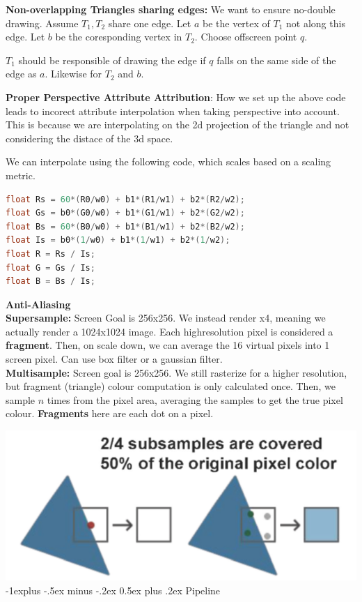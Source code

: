 \documentclass[letterpaper, 8pt]{extarticle}
\makeatletter
\renewcommand{\section}{\@startsection{section}{1}{0mm}%
                                {-1explus -.5ex minus -.2ex}%
                                {0.5ex plus .2ex}%
                                {\normalfont\small\bfseries}}
\makeatother
\begin{document}
\begin{multicols*}{4}

\textbf{Non-overlapping Triangles sharing edges:} We want to ensure no-double drawing.
Assume $T_1, T_2$ share one edge. Let $a$ be the vertex of $T_1$ not along this edge. Let $b$ be the coresponding vertex in $T_2$.
Choose offscreen point $q$.

$T_1$ should be responsible of drawing the edge if $q$ falls on the same side of the edge as $a$. Likewise for $T_2$ and $b$.


\textbf{Proper Perspective Attribute Attribution}: How we set up the above code leads to incorect attribute interpolation when taking perspective into account.
This is because we are interpolating on the 2d projection of the triangle and not considering the distace of the 3d space.

We can interpolate using the following code, which scales based on a scaling metric.

\begin{lstlisting}[language=C++]
float Rs = 60*(R0/w0) + b1*(R1/w1) + b2*(R2/w2);
float Gs = b0*(G0/w0) + b1*(G1/w1) + b2*(G2/w2);
float Bs = 60*(B0/w0) + b1*(B1/w1) + b2*(B2/w2);
float Is = b0*(1/w0) + b1*(1/w1) + b2*(1/w2);
float R = Rs / Is;
float G = Gs / Is;
float B = Bs / Is;
\end{lstlisting}


\textbf{Anti-Aliasing}\\
\textbf{Supersample: }Screen Goal is 256x256. We instead render x4, meaning we actually render a 1024x1024 image. Each highresolution pixel is considered a \textbf{fragment}.
Then, on scale down, we can average the 16 virtual pixels into 1 screen pixel.
Can use box filter or a gaussian filter.\\
\textbf{Multisample: }
Screen goal is 256x256. We still rasterize for a higher resolution, but fragment (triangle) colour computation is only calculated once.
Then, we sample $n$ times from the pixel area, averaging the samples to get the true pixel colour.
\textbf{Fragments} here are each dot on a pixel.

\includegraphics[width=.5\linewidth]{multi-sampling.png}
\section{Pipeline}


\end{multicols*}
\end{document}
